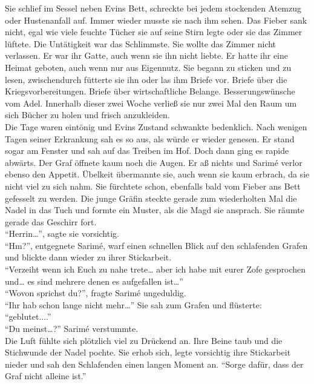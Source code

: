 Sie schlief im Sessel neben Evins Bett, schreckte bei jedem stockenden Atemzug 
oder Hustenanfall auf. Immer wieder musste sie nach ihm sehen. Das Fieber sank nicht, egal wie 
viele feuchte Tücher sie auf seine Stirn legte oder sie das Zimmer lüftete. Die Untätigkeit war das 
Schlimmste. Sie wollte das Zimmer nicht verlassen. Er war ihr Gatte, auch wenn sie ihn nicht 
liebte. Er hatte ihr eine Heimat geboten, auch wenn nur aus Eigennutz. Sie begann zu sticken und zu 
lesen, zwischendurch fütterte sie ihn oder las ihm Briefe vor. Briefe über die Kriegsvorbereitungen. 
Briefe über wirtschaftliche Belange. Besserungswünsche vom Adel. Innerhalb dieser zwei Woche verließ 
sie nur zwei Mal den Raum um sich Bücher zu holen und frisch anzukleiden.\\
Die Tage waren eintönig und Evins Zustand schwankte bedenklich. Nach wenigen Tagen seiner 
Erkrankung sah es so aus, als würde er wieder genesen. Er stand sogar am Fenster und sah auf das 
Treiben im Hof. Doch dann ging es rapide abwärts. Der Graf öffnete kaum noch die Augen. Er aß nichts 
und Sarimé verlor ebenso den Appetit. Übelkeit übermannte sie, auch wenn sie kaum erbrach, da sie 
nicht viel zu sich nahm. Sie fürchtete schon, ebenfalls bald vom Fieber ans Bett gefesselt zu 
werden. Die junge Gräfin steckte gerade zum wiederholten Mal die Nadel in das Tuch und formte ein 
Muster, als die Magd sie ansprach. Sie räumte gerade das Geschirr fort. \\
``Herrin…'', sagte sie vorsichtig.\\
``Hm?'', entgegnete Sarimé, warf einen schnellen Blick auf den schlafenden Grafen und blickte dann 
wieder zu ihrer Stickarbeit.\\
``Verzeiht wenn ich Euch zu nahe trete… aber ich habe mit eurer Zofe gesprochen und… es sind 
mehrere denen es aufgefallen ist…''\\
``Wovon sprichst du?'', fragte Sarimé ungeduldig.\\
``Ihr hab schon lange nicht mehr…'' Sie sah zum Grafen und flüsterte: ``geblutet....''\\
``Du meinst…?'' Sarimé verstummte.\\
Die Luft fühlte sich plötzlich viel zu Drückend an. Ihre Beine taub und die Stichwunde der Nadel 
pochte. Sie erhob sich, legte vorsichtig ihre Stickarbeit nieder und sah den Schlafenden einen 
langen Moment an. ``Sorge dafür, dass der Graf nicht alleine ist.''\\


